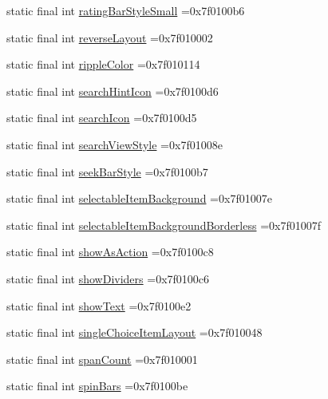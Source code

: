 \begin{DoxyCompactItemize}
\item 
static final int \hyperlink{classproject4_1_1xaria_1_1R_1_1attr_a3168177e8711f1f1fbcfd6c1782f6af7}{rating\+Bar\+Style\+Small} =0x7f0100b6
\item 
static final int \hyperlink{classproject4_1_1xaria_1_1R_1_1attr_ad4cb544d3ca8e42c05df28ea8a04768a}{reverse\+Layout} =0x7f010002
\item 
static final int \hyperlink{classproject4_1_1xaria_1_1R_1_1attr_a712044b29c07e7adbd925eb4812660fe}{ripple\+Color} =0x7f010114
\item 
static final int \hyperlink{classproject4_1_1xaria_1_1R_1_1attr_ac3a7e099da434adbc583aee83c803190}{search\+Hint\+Icon} =0x7f0100d6
\item 
static final int \hyperlink{classproject4_1_1xaria_1_1R_1_1attr_a36e8f448881a8401fd68fae83556158f}{search\+Icon} =0x7f0100d5
\item 
static final int \hyperlink{classproject4_1_1xaria_1_1R_1_1attr_a1426985217d53e8b5462a33852726bcf}{search\+View\+Style} =0x7f01008e
\item 
static final int \hyperlink{classproject4_1_1xaria_1_1R_1_1attr_a3a7de88c3a4a5f59c01478d794063961}{seek\+Bar\+Style} =0x7f0100b7
\item 
static final int \hyperlink{classproject4_1_1xaria_1_1R_1_1attr_a2e776b1c49ec1662136744a824e24a19}{selectable\+Item\+Background} =0x7f01007e
\item 
static final int \hyperlink{classproject4_1_1xaria_1_1R_1_1attr_af949c147fbea947b5f1ead8ce1e2be78}{selectable\+Item\+Background\+Borderless} =0x7f01007f
\item 
static final int \hyperlink{classproject4_1_1xaria_1_1R_1_1attr_a677f8c338feb479fa489e4c40325f0f5}{show\+As\+Action} =0x7f0100c8
\item 
static final int \hyperlink{classproject4_1_1xaria_1_1R_1_1attr_a94ea924a465e7254ff8282d55bae560e}{show\+Dividers} =0x7f0100c6
\item 
static final int \hyperlink{classproject4_1_1xaria_1_1R_1_1attr_ab469c11f55b52f5819bffa3e4fb0df36}{show\+Text} =0x7f0100e2
\item 
static final int \hyperlink{classproject4_1_1xaria_1_1R_1_1attr_a762cfc65f19982d1f352aa0de4487a44}{single\+Choice\+Item\+Layout} =0x7f010048
\item 
static final int \hyperlink{classproject4_1_1xaria_1_1R_1_1attr_aa031c4f7c55f05ec3ac977820b23242e}{span\+Count} =0x7f010001
\item 
static final int \hyperlink{classproject4_1_1xaria_1_1R_1_1attr_af1d3ef014b1fb93c27e176c328f92ae3}{spin\+Bars} =0x7f0100be

\end{DoxyCompactItemize}
